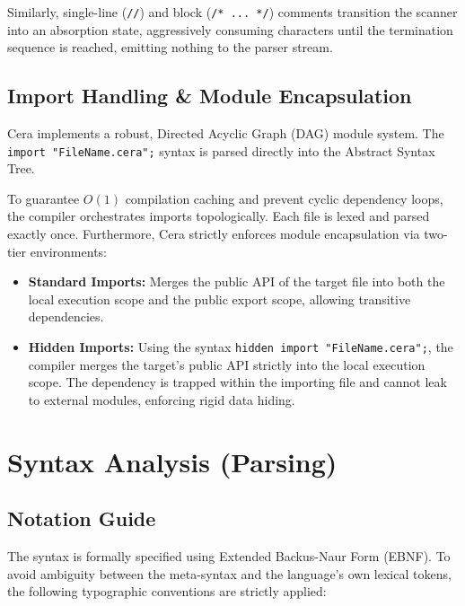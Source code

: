 \documentclass[11pt, a4paper]{article}
\begin{document}
Similarly, single-line (\texttt{//}) and block (\texttt{/* ... */}) comments transition the scanner into an absorption state, aggressively consuming characters until the termination sequence is reached, emitting nothing to the parser stream.

\subsection{Import Handling \& Module Encapsulation}
Cera implements a robust, Directed Acyclic Graph (DAG) module system. The \texttt{import "FileName.cera";} syntax is parsed directly into the Abstract Syntax Tree. 

To guarantee $O(1)$ compilation caching and prevent cyclic dependency loops, the compiler orchestrates imports topologically. Each file is lexed and parsed exactly once. Furthermore, Cera strictly enforces module encapsulation via two-tier environments:
\begin{itemize}
    \item \textbf{Standard Imports:} Merges the public API of the target file into both the local execution scope and the public export scope, allowing transitive dependencies.
    \item \textbf{Hidden Imports:} Using the syntax \texttt{hidden import "FileName.cera";}, the compiler merges the target's public API strictly into the local execution scope. The dependency is trapped within the importing file and cannot leak to external modules, enforcing rigid data hiding.
\end{itemize}

\section{Syntax Analysis (Parsing)}
\noindent
\subsection{Notation Guide}

The syntax is formally specified using Extended Backus-Naur Form (EBNF). To avoid ambiguity between the meta-syntax and the language's own lexical tokens, the following typographic conventions are strictly applied:
\end{document}

